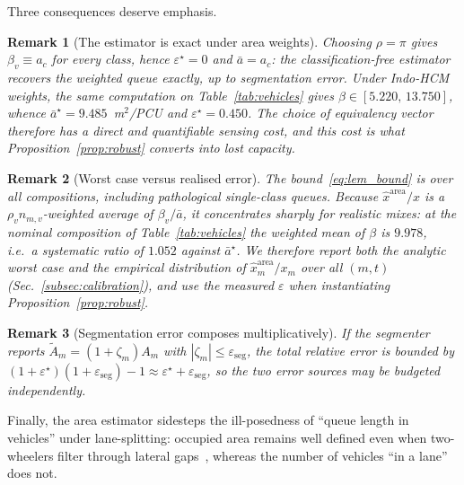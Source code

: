 \documentclass[journal]{IEEEtran}
\newtheorem{remark}{Remark}
\begin{document}
Three consequences deserve emphasis.

\begin{remark}[The estimator is exact under area weights]
\label{rem:exact}
Choosing $\rho = \pi$ gives $\beta_v \equiv a_c$ for every class, hence
$\varepsilon^\star = 0$ and $\bar a = a_c$: the classification-free
estimator recovers the weighted queue \emph{exactly}, up to segmentation
error. Under Indo-HCM weights, the same computation on
Table~\ref{tab:vehicles} gives $\beta \in [5.220,\,13.750]$, whence
$\bar a^\star = 9.485$~m$^2$/PCU and $\varepsilon^\star = 0.450$. The
choice of equivalency vector therefore has a direct and quantifiable
sensing cost, and this cost is what
Proposition~\ref{prop:robust} converts into lost capacity.
\end{remark}

\begin{remark}[Worst case versus realised error]
\label{rem:realised}
The bound~\eqref{eq:lem_bound} is over \emph{all} compositions,
including pathological single-class queues. Because
$\hat{x}^{\mathrm{area}}/x$ is a $\rho_v n_{m,v}$-weighted average of
$\beta_v/\bar a$, it concentrates sharply for realistic mixes: at the
nominal composition of Table~\ref{tab:vehicles} the weighted mean of
$\beta$ is $9.978$, i.e.\ a systematic ratio of $1.052$ against
$\bar a^\star$. We therefore report both the analytic worst case and the
empirical distribution of $\hat{x}^{\mathrm{area}}_m/x_m$ over all
$(m,t)$ (Sec.~\ref{subsec:calibration}), and use the measured
$\varepsilon$ when instantiating Proposition~\ref{prop:robust}.
\end{remark}

\begin{remark}[Segmentation error composes multiplicatively]
If the segmenter reports $\tilde A_m = (1+\zeta_m) A_m$ with
$|\zeta_m| \le \varepsilon_{\mathrm{seg}}$, the total relative error is
bounded by $(1+\varepsilon^\star)(1+\varepsilon_{\mathrm{seg}})-1
\approx \varepsilon^\star + \varepsilon_{\mathrm{seg}}$, so the two error
sources may be budgeted independently.
\end{remark}

Finally, the area estimator sidesteps the ill-posedness of ``queue length
in vehicles'' under lane-splitting: occupied area remains well defined
even when two-wheelers filter through lateral gaps~\cite{b_simtram},
whereas the number of vehicles ``in a lane'' does not.
\end{document}
